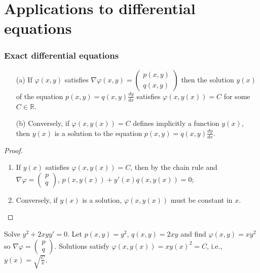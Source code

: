 \documentclass[aspectratio=169,handout]{beamer}
\newcommand{\bR}{\mathbb{R}} %
\begin{document}
\section{Applications to differential equations}


\begin{frame}
    \frametitle{Exact  differential equations {}}

    \begin{theorem}
        \begin{enumerate}
            \item[(a)]         If \(\varphi(x,y)\) satisfies 
            \(\nabla \varphi(x,y) =   \left(\begin{smallmatrix}
                p(x,y) \\ q(x,y)
            \end{smallmatrix}\right)\) 
            then the solution \(y(x)\) of the equation \(p(x,y) = q(x,y) \frac{d y}{d x}\) satisfies \(\varphi(x,y(x))=C\) for some \(C\in \bR\).
            \item[(b)] Conversely, if  \(\varphi(x,y(x))=C\)  defines implicitly a function \(y(x)\), then \(y(x)\) is a solution to the equation  \(p(x,y) = q(x,y) \frac{d y}{d x}\).
        \end{enumerate}
    \end{theorem}

    \begin{proof}
        \begin{enumerate}
            \item If \(y(x)\) satisfies  \(\varphi(x,y(x))=C\), then by the chain rule and \(\nabla \varphi =   \left(\begin{smallmatrix}
                p \\ q
            \end{smallmatrix}\right)\), \(p(x,y(x)) + y'(x) q(x,y(x)) = 0\);
            \item Conversely, if \(y(x)\) is a solution, \(\varphi(x,y(x))\) must be constant in \(x\). \qedhere 
        \end{enumerate}
    \end{proof}

    \begin{example}
        Solve \(y^2 + 2xyy' = 0\).
        Let \(p(x,y) = y^2\), \(q(x,y) = 2xy\) and find \(\varphi(x,y) = xy^2\) so \(\nabla \varphi = \left(\begin{smallmatrix}
            p\\ q
        \end{smallmatrix}\right)\).
        Solutions satisfy \(\varphi(x,y(x))= x y(x)^2 =C\), i.e., \(y(x) = \sqrt{\frac{C}{x}}\). 
    \end{example}

\end{frame}
\end{document}
